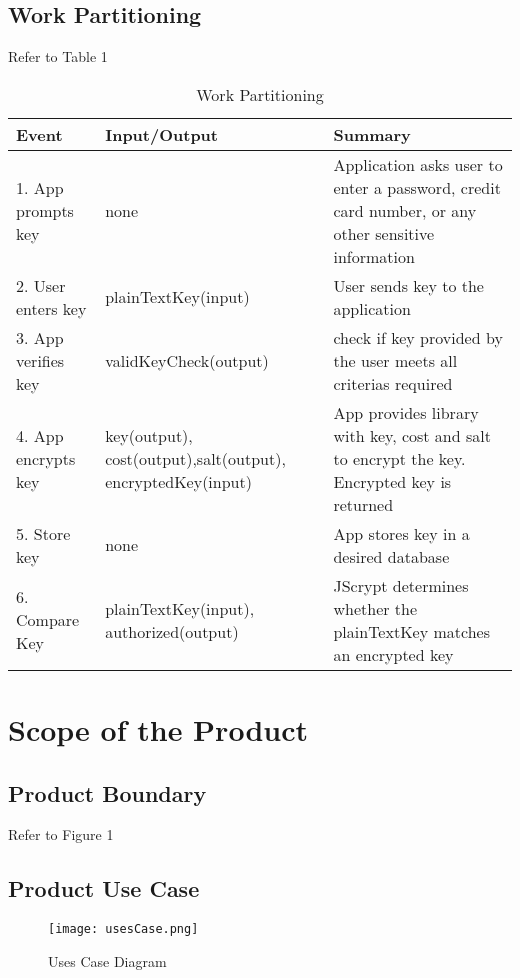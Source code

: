\documentclass[12pt]{article}
\begin{document}
\subsection{Work Partitioning}
	Refer to Table 1
	\begin{table}[H]

	    \caption{Work Partitioning}
	    \label{tab:table1}

	    \begin{tabular}{ | p{4cm} | p{4cm} | p{7cm}| }
	    	\hline
	      		Event & Input/Output & Summary \\
	      \hline

	     		1. App prompts key & none & Application asks user to enter a password, credit card number, or any other sensitive information \\
	     \hline

	     	2. User enters key & plainTextKey(input) & User sends key to the application \\
	     \hline

	     	3. App verifies key & validKeyCheck(output) & check if key provided by the user meets all criterias required \\

	     \hline

	     	4. App encrypts key & key(output), cost(output),salt(output), encryptedKey(input) & App provides library with key, cost and salt to encrypt the key. Encrypted key is returned \\
	     \hline
	     	5. Store key & none & App stores key in a desired database \\
	     \hline
	     	6. Compare Key & plainTextKey(input), authorized(output) & JScrypt determines whether the plainTextKey matches an encrypted key \\
	     \hline
	    \end{tabular}
	   
	\end{table}

\section{Scope of the Product}

\subsection{Product Boundary}
	Refer to Figure 1	

\subsection{Product Use Case}
	\begin{figure}[H]
	\centerline{\texttt{[image: usesCase.png]}}
	\caption{Uses Case Diagram}
	\end{figure}
\end{document}
